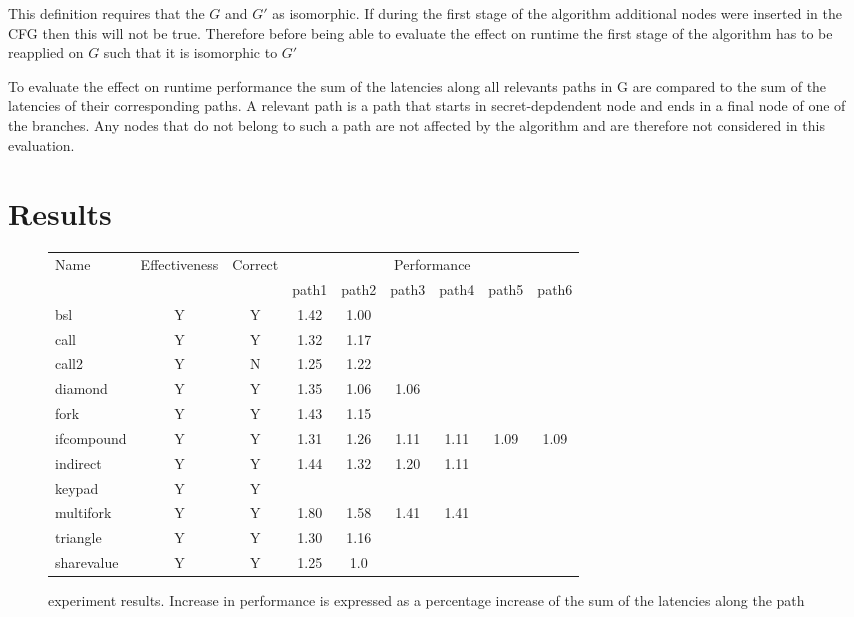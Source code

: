 This definition requires that the $G$ and $G'$ as isomorphic. If during the first stage of the algorithm additional nodes were inserted in the CFG
then this will not be true. Therefore before being able to evaluate the effect on runtime the first stage of the algorithm has to be reapplied on $G$ such 
that it is isomorphic to $G'$

To evaluate the effect on runtime performance the sum of the latencies along all relevants paths in G are compared to the sum of the latencies of their corresponding paths. A relevant path is a path that starts in secret-depdendent node and ends in a final node of one of the branches. Any nodes that do not belong to such a path 
are not affected by the algorithm and are therefore not considered in this evaluation. 

    
\section{Results}

\begin{figure}
    \centering
    \begin{tabular}{ l | c | c | c c c c c c }
    Name & Effectiveness & Correct & \multicolumn{6}{c}{Performance} \\ 
     & & & path1 & path2 & path3 & path4 & path5 & path6\\
     \hline 
    bsl         & Y & Y & 1.42 & 1.00 & & & &  \\ 
    call        & Y & Y & 1.32 & 1.17 & &  & & \\  
    call2       & Y & N & 1.25 & 1.22 & &  & & \\
    diamond     & Y & Y & 1.35 & 1.06 & 1.06 & & &  \\ 
    fork        & Y & Y & 1.43 & 1.15 & & & &  \\  
    ifcompound  & Y & Y & 1.31 & 1.26 & 1.11 & 1.11 & 1.09 & 1.09  \\
    indirect    & Y & Y & 1.44 & 1.32 & 1.20 & 1.11 & & \\ 
    keypad      & Y & Y &  &  &  &  &  &   \\  
    multifork   & Y & Y & 1.80 & 1.58 & 1.41 & 1.41 & &   \\
    triangle    & Y & Y & 1.30 & 1.16 & & & &  \\
    sharevalue  & Y & Y & 1.25 & 1.0 & & & &  \\
    \end{tabular}
    \caption{experiment results. Increase in performance is expressed as a percentage increase of the sum of the latencies along the path}
    \label{fig:experiment results }
\end{figure}

